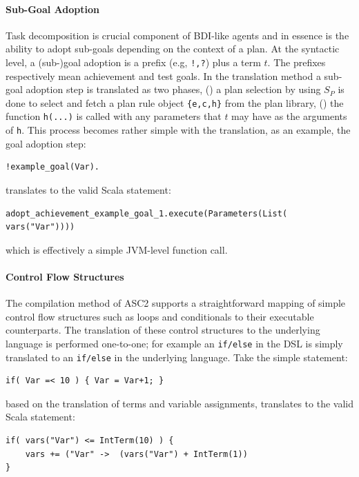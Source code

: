 \paragraph{Sub-Goal Adoption}
Task decomposition is crucial component of BDI-like agents and in essence is the ability to adopt sub-goals depending on the context of a plan. At the syntactic level, a (sub-)goal adoption is a prefix (e.g, \verb+!,?+) plus a term $t$. The prefixes respectively mean achievement and test goals. In the translation method a sub-goal adoption step is translated as two phases, () a plan selection by using $S_P$ is done to select and fetch a plan rule object \verb+{e,c,h}+ from the plan library, () the function \verb+h(...)+ is called with any parameters that $t$ may have as the arguments of \verb+h+. This process becomes rather simple with the translation, as an example, the goal adoption step:
\begin{verbatim}
!example_goal(Var).
\end{verbatim}
\noindent translates to the valid Scala statement:
\begin{verbatim}
adopt_achievement_example_goal_1.execute(Parameters(List( vars("Var"))))
\end{verbatim}
\noindent which is effectively a simple JVM-level function call. 

\paragraph{Control Flow Structures}
The compilation method of ASC2 supports a  straightforward mapping of simple control flow structures such as loops and conditionals to their executable counterparts. The translation of these control structures to the underlying language is performed one-to-one; for example an \verb+if/else+ in the DSL is simply translated to an \verb+if/else+ in the underlying language. Take the simple statement:
\begin{verbatim}
if( Var =< 10 ) { Var = Var+1; }
\end{verbatim}
\noindent based on the translation of terms and variable assignments, translates to the valid Scala statement:
\begin{verbatim}
if( vars("Var") <= IntTerm(10) ) {
    vars += ("Var" ->  (vars("Var") + IntTerm(1)) 
}
\end{verbatim}

